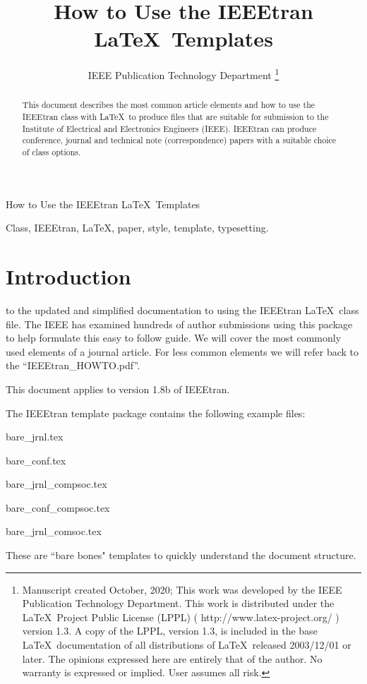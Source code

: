 \documentclass[lettersize,journal]{IEEEtran}
\begin{document}
\title{How to Use the IEEEtran \LaTeX \ Templates}
\author{IEEE Publication Technology Department
\thanks{Manuscript created October, 2020; This work was developed by the IEEE Publication Technology Department. This work is distributed under the \LaTeX \ Project Public License (LPPL) ( http://www.latex-project.org/ ) version 1.3. A copy of the LPPL, version 1.3, is included in the base \LaTeX \ documentation of all distributions of \LaTeX \ released 2003/12/01 or later. The opinions expressed here are entirely that of the author. No warranty is expressed or implied. User assumes all risk.}}

%
{How to Use the IEEEtran \LaTeX \ Templates}

\maketitle

\begin{abstract}
This document describes the most common article elements and how to use the IEEEtran class with \LaTeX \ to produce files that are suitable for submission to the Institute of Electrical and Electronics Engineers (IEEE).  IEEEtran can produce conference, journal and technical note (correspondence) papers with a suitable choice of class options.
\end{abstract}

\begin{IEEEkeywords}
Class, IEEEtran, \LaTeX, paper, style, template, typesetting.
\end{IEEEkeywords}


\section{Introduction}
 to the updated and simplified documentation to using the IEEEtran \LaTeX \ class file. The IEEE has examined hundreds of author submissions using this package to help formulate this easy to follow guide. We will cover the most commonly used elements of a journal article. For less common elements we will refer back to the ``IEEEtran\_HOWTO.pdf''.

This document applies to version 1.8b of IEEEtran. 

The IEEEtran template package contains the following example files: 
\begin{list}{}{}
\item{bare\_jrnl.tex}
\item{bare\_conf.tex}
\item{bare\_jrnl\_compsoc.tex}
\item{bare\_conf\_compsoc.tex}
\item{bare\_jrnl\_comsoc.tex}
\end{list}
These are ``bare bones" templates to quickly understand the document structure.  
\end{document}
